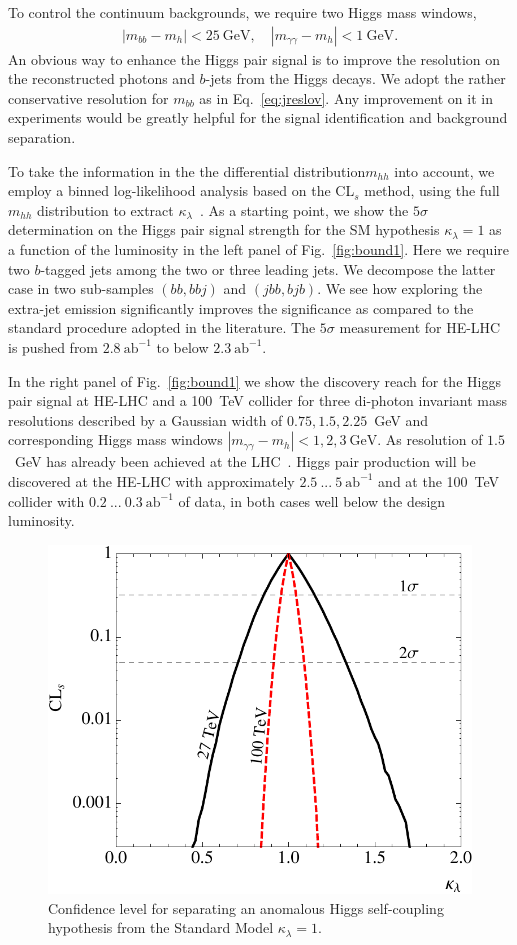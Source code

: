 To control the continuum backgrounds, we require two Higgs mass windows,
%
\begin{align}
 |m_{bb}-m_h|<25~\text{GeV}, \quad 
 |m_{\gamma\gamma}-m_h|<1~\text{GeV}  .
 \label{eq:jreslov}
\end{align}
%
An obvious way to enhance the Higgs pair signal is to improve the
resolution on the reconstructed photons and $b$-jets from the Higgs
decays.  We adopt the rather conservative resolution for $m_{bb}$ as
in Eq.~\eqref{eq:jreslov}. Any improvement on it in experiments would
be greatly helpful for the signal identification and background
separation.  
\medskip

To take the information in the the differential distribution$m_{hh}$ into account, we employ a binned log-likelihood analysis based on the CL$_{s}$ method, using the full $m_{hh}$ distribution to extract $\kappa_{\lambda}$~\cite{read}. As a starting point, we show the $5\sigma$ determination on the Higgs pair signal strength for the SM hypothesis $\kappa_{\lambda}=1$ as a function of the luminosity in the left panel of Fig.~\ref{fig:bound1}. Here we require two $b$-tagged jets among the two or three leading jets. We decompose the latter case in two  sub-samples $(bb,bbj)$ and $(jbb,bjb)$. We see how exploring the extra-jet emission significantly improves the significance as compared to the standard procedure adopted in the literature. The $5\sigma$ measurement for HE-LHC is pushed from $2.8~\text{ab}^{-1}$ to below $2.3~\text{ab}^{-1}$. 

In the right panel of Fig.~\ref{fig:bound1} we show the discovery reach for the Higgs pair signal at HE-LHC and a 100~TeV collider for three di-photon invariant mass resolutions described by a Gaussian width of 
$0.75,1.5,2.25$~GeV and corresponding Higgs mass windows 
$|m_{\gamma\gamma}-m_h|<1,2,3~\text{GeV}$. As resolution of $1.5$~GeV 
has already been achieved at the LHC~\cite{CMS:2016zjv}. Higgs pair 
production will be discovered at the HE-LHC with approximately 
$2.5~...~5~\text{ab}^{-1}$ and at the 100~TeV collider with $0.2~...~0.3~\text{ab}^{-1}$ of data, in both cases well below the design luminosity.

\begin{figure}[t!]
\centering 
  \includegraphics[width=.4\textwidth]{section3/plots/hh_dlamb}
  \caption{Confidence level for separating an anomalous Higgs
    self-coupling hypothesis from the Standard Model
    $\kappa_{\lambda}=1$.}
 \label{fig:bound2}
\end{figure}


